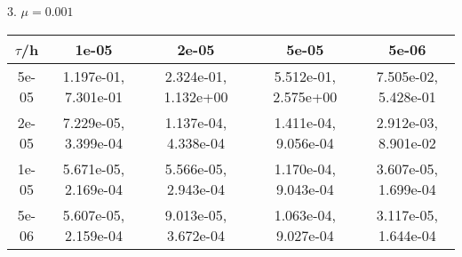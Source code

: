 3. $\mu = 0.001$
\begin{center}
	\begin{tabular}{|c|c|c|c|c|} 
		\hline
		$\tau$/h & 1e-05 & 2e-05 & 5e-05 & 5e-06 \\ 
		\hline
		5e-05 & 1.197e-01,  7.301e-01 & 2.324e-01,  1.132e+00 & 5.512e-01,  2.575e+00 & 7.505e-02,  5.428e-01\\ 
		\hline
		2e-05 & 7.229e-05,  3.399e-04 & 1.137e-04,  4.338e-04 & 1.411e-04,  9.056e-04 & 2.912e-03, 8.901e-02\\ 
		\hline
		1e-05 & 5.671e-05,  2.169e-04 & 5.566e-05,  2.943e-04 & 1.170e-04,  9.043e-04 & 3.607e-05,  1.699e-04\\ 
		\hline
		5e-06 & 5.607e-05,  2.159e-04 & 9.013e-05,  3.672e-04 & 1.063e-04, 9.027e-04 & 3.117e-05, 1.644e-04\\ 
		\hline
	\end{tabular}
\end{center}